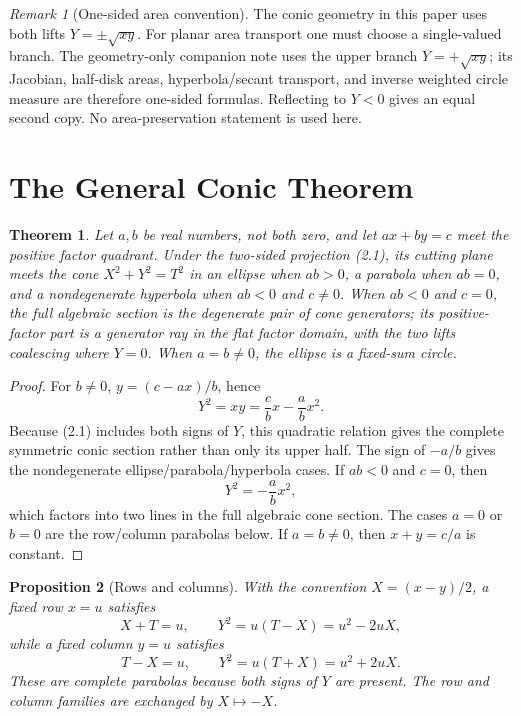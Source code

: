 \documentclass[11pt]{amsart}
\newtheorem{theorem}{Theorem}[section]
\newtheorem{proposition}[theorem]{Proposition}
\theoremstyle{remark}
\newtheorem*{remark}{Remark}
\begin{document}
\begin{remark}[One-sided area convention]
The conic geometry in this paper uses both lifts $Y=\pm\sqrt{xy}$. For planar area transport one must choose a single-valued branch. The geometry-only companion note \cite{Ebert2026Area} uses the upper branch $Y=+\sqrt{xy}$; its Jacobian, half-disk areas, hyperbola/secant transport, and inverse weighted circle measure are therefore one-sided formulas. Reflecting to $Y<0$ gives an equal second copy. No area-preservation statement is used here.
\end{remark}

\section{The General Conic Theorem}
\begin{theorem}\label{thm:conic}
Let $a,b$ be real numbers, not both zero, and let $ax+by=c$ meet the positive factor quadrant. Under the two-sided projection (2.1), its cutting plane meets the cone $X^2+Y^2=T^2$ in an ellipse when $ab>0$, a parabola when $ab=0$, and a nondegenerate hyperbola when $ab<0$ and $c\ne0$. When $ab<0$ and $c=0$, the full algebraic section is the degenerate pair of cone generators; its positive-factor part is a generator ray in the flat factor domain, with the two lifts coalescing where $Y=0$. When $a=b\ne0$, the ellipse is a fixed-sum circle.
\end{theorem}
\begin{proof}
For $b\ne0$, $y=(c-ax)/b$, hence
\[
Y^2=xy=\frac cbx-\frac abx^2.
\]
Because (2.1) includes both signs of $Y$, this quadratic relation gives the complete symmetric conic section rather than only its upper half. The sign of $-a/b$ gives the nondegenerate ellipse/parabola/hyperbola cases. If $ab<0$ and $c=0$, then
\[
Y^2=-\frac ab x^2,
\]
which factors into two lines in the full algebraic cone section. The cases $a=0$ or $b=0$ are the row/column parabolas below. If $a=b\ne0$, then $x+y=c/a$ is constant.
\end{proof}

\begin{proposition}[Rows and columns]\label{prop:rows}
With the convention $X=(x-y)/2$, a fixed row $x=u$ satisfies
\[
X+T=u,\qquad Y^2=u(T-X)=u^2-2uX,
\]
while a fixed column $y=u$ satisfies
\[
T-X=u,\qquad Y^2=u(T+X)=u^2+2uX.
\]
These are complete parabolas because both signs of $Y$ are present. The row and column families are exchanged by $X\mapsto-X$.
\end{proposition}
\end{document}
